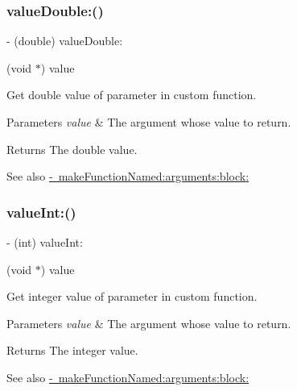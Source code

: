 \subsubsection{\texorpdfstring{value\+Double\+:()}{valueDouble:()}}
{\footnotesize\ttfamily -\/ (double) value\+Double\+: \begin{DoxyParamCaption}\item[{(void $\ast$)}]{value }\end{DoxyParamCaption}}

Get double value of parameter in custom function.


\begin{DoxyParams}{Parameters}
{\em value} & The argument whose value to return. \\
\hline
\end{DoxyParams}
\begin{DoxyReturn}{Returns}
The double value.
\end{DoxyReturn}
\begin{DoxySeeAlso}{See also}
\mbox{\hyperlink{interface_o_p_t_l_y_f_m_d_b_database_af2c3e10041c8d0a95e2feb84a2ffa645}{-\/ make\+Function\+Named\+:arguments\+:block\+:}} 
\end{DoxySeeAlso}
\mbox{\label{interface_o_p_t_l_y_f_m_d_b_database_ae86df2d5f08b22824e4f5c14fb436b7a}} 
\subsubsection{\texorpdfstring{value\+Int\+:()}{valueInt:()}}
{\footnotesize\ttfamily -\/ (int) value\+Int\+: \begin{DoxyParamCaption}\item[{(void $\ast$)}]{value }\end{DoxyParamCaption}}

Get integer value of parameter in custom function.


\begin{DoxyParams}{Parameters}
{\em value} & The argument whose value to return. \\
\hline
\end{DoxyParams}
\begin{DoxyReturn}{Returns}
The integer value.
\end{DoxyReturn}
\begin{DoxySeeAlso}{See also}
\mbox{\hyperlink{interface_o_p_t_l_y_f_m_d_b_database_af2c3e10041c8d0a95e2feb84a2ffa645}{-\/ make\+Function\+Named\+:arguments\+:block\+:}} 
\end{DoxySeeAlso}
\mbox{\label{interface_o_p_t_l_y_f_m_d_b_database_aebdb8f230b7998ffa60011e4ebba56cc}} 
